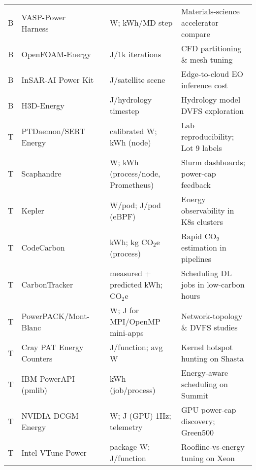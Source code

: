 \begin{table*}[hptb]
\begin{tabularx}{1.0\textwidth}{|llllX|}
B & VASP-Power Harness           & \cite{vasppower2023}        & W; kWh/MD step                        & Materials-science accelerator compare \\
B & OpenFOAM-Energy              & \cite{openfoamenergy2021}   & J/1k iterations                       & CFD partitioning \& mesh tuning \\
B & InSAR-AI Power Kit           & \cite{insarpower2024}       & J/satellite scene                      & Edge-to-cloud EO inference cost \\
B & H3D-Energy                   & \cite{h3denergy2023}        & J/hydrology timestep                & Hydrology model DVFS exploration \\ \hline\hline  
T & PTDaemon/SERT Energy       & \cite{specptdaemonser}      & calibrated W; kWh (node)                & Lab reproducibility; Lot 9 labels \\
T & Scaphandre                   & \cite{scaphandre}           & W; kWh (process/node, Prometheus)     & Slurm dashboards; power-cap feedback \\
T & Kepler                       & \cite{kepler}               & W/pod; J/pod (eBPF)                 & Energy observability in K8s clusters \\
T & CodeCarbon                   & \cite{codecarbon}           & kWh; kg CO\(_2\)e (process)             & Rapid CO\(_2\) estimation in pipelines \\
T & CarbonTracker                & \cite{carbontracker}        & measured + predicted kWh; CO\(_2\)e     & Scheduling DL jobs in low-carbon hours \\
T & PowerPACK/Mont-Blanc       & \cite{powerpackmontbl}      & W; J for MPI/OpenMP mini-apps         & Network-topology \& DVFS studies \\
T & Cray PAT Energy Counters     & \cite{craypatenergyco}      & J/function; avg W                     & Kernel hotspot hunting on Shasta \\
T & IBM PowerAPI (pmlib)         & \cite{ibmpowerapipmli}      & kWh (job/process)                      & Energy-aware scheduling on Summit \\
T & NVIDIA DCGM Energy           & \cite{nvidiadcgmenerg}      & W; J (GPU) \@ 1Hz; telemetry           & GPU power-cap discovery; Green500 \\
T & Intel VTune Power            & \cite{intelvtunepower}      & package W; J/function                 & Roofline-vs-energy tuning on Xeon \\ 

\bottomrule   
  \end{tabularx}
\end{table*}


